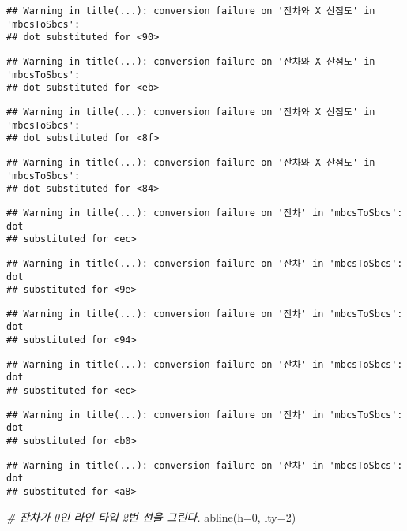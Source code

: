 \documentclass[
]{article}
\newenvironment{Shaded}{\begin{snugshade}}{\end{snugshade}}
\newcommand{\AttributeTok}[1]{\textcolor[rgb]{0.77,0.63,0.00}{#1}}
\newcommand{\CommentTok}[1]{\textcolor[rgb]{0.56,0.35,0.01}{\textit{#1}}}
\newcommand{\DecValTok}[1]{\textcolor[rgb]{0.00,0.00,0.81}{#1}}
\newcommand{\FunctionTok}[1]{\textcolor[rgb]{0.00,0.00,0.00}{#1}}
\newcommand{\NormalTok}[1]{#1}
\begin{document}
\begin{verbatim}
## Warning in title(...): conversion failure on '잔차와 X 산점도' in 'mbcsToSbcs':
## dot substituted for <90>
\end{verbatim}

\begin{verbatim}
## Warning in title(...): conversion failure on '잔차와 X 산점도' in 'mbcsToSbcs':
## dot substituted for <eb>
\end{verbatim}

\begin{verbatim}
## Warning in title(...): conversion failure on '잔차와 X 산점도' in 'mbcsToSbcs':
## dot substituted for <8f>
\end{verbatim}

\begin{verbatim}
## Warning in title(...): conversion failure on '잔차와 X 산점도' in 'mbcsToSbcs':
## dot substituted for <84>
\end{verbatim}

\begin{verbatim}
## Warning in title(...): conversion failure on '잔차' in 'mbcsToSbcs': dot
## substituted for <ec>
\end{verbatim}

\begin{verbatim}
## Warning in title(...): conversion failure on '잔차' in 'mbcsToSbcs': dot
## substituted for <9e>
\end{verbatim}

\begin{verbatim}
## Warning in title(...): conversion failure on '잔차' in 'mbcsToSbcs': dot
## substituted for <94>
\end{verbatim}

\begin{verbatim}
## Warning in title(...): conversion failure on '잔차' in 'mbcsToSbcs': dot
## substituted for <ec>
\end{verbatim}

\begin{verbatim}
## Warning in title(...): conversion failure on '잔차' in 'mbcsToSbcs': dot
## substituted for <b0>
\end{verbatim}

\begin{verbatim}
## Warning in title(...): conversion failure on '잔차' in 'mbcsToSbcs': dot
## substituted for <a8>
\end{verbatim}

\begin{Shaded}
\begin{Highlighting}[]
\CommentTok{\# 잔차가 0인 라인 타입 2번 선을 그린다.}
\FunctionTok{abline}\NormalTok{(}\AttributeTok{h=}\DecValTok{0}\NormalTok{, }\AttributeTok{lty=}\DecValTok{2}\NormalTok{)}
\end{Highlighting}
\end{Shaded}
\end{document}
